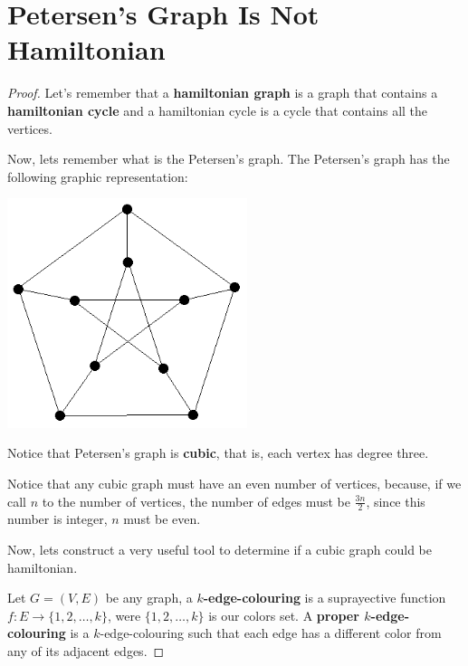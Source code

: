 ﻿\chapter{Petersen's Graph Is Not Hamiltonian}

    
    \begin{proof}
        Let's remember that a \textbf{hamiltonian graph} is a graph that contains a \textbf{hamiltonian cycle} and a hamiltonian cycle is
        a cycle that contains all the vertices.\pn
        
        Now, lets remember what is the Petersen's graph. The Petersen's graph has the following graphic representation:
        \begin{center}
            \includegraphics[width=7cm]{PetersenIsNotHamiltonian/Petersen1.png}    
        \end{center}\pn
        
        Notice that Petersen's graph is \textbf{cubic}, that is, each vertex has degree three.\pn 

        Notice that any cubic graph must have an even number of vertices, because, if we call $n$ to the number of vertices, 
        the number of edges must be $\frac{3n}{2}$, since this number is integer, $n$ must be even.\pn
        
        Now, lets construct a very useful tool to determine if a cubic graph could be hamiltonian.\pn 
        
        Let $G = (V, E)$ be any graph, a \textbf{$k$-edge-colouring} is a suprayective function $f : E \longrightarrow \{1, 2, \dots, k\}$, 
        were $\{1, 2, \dots, k\}$ is our colors set. A \textbf{proper $k$-edge-colouring} is a $k$-edge-colouring such that each edge has a 
        different color from any of its adjacent edges.\pn
               

\end{proof}
